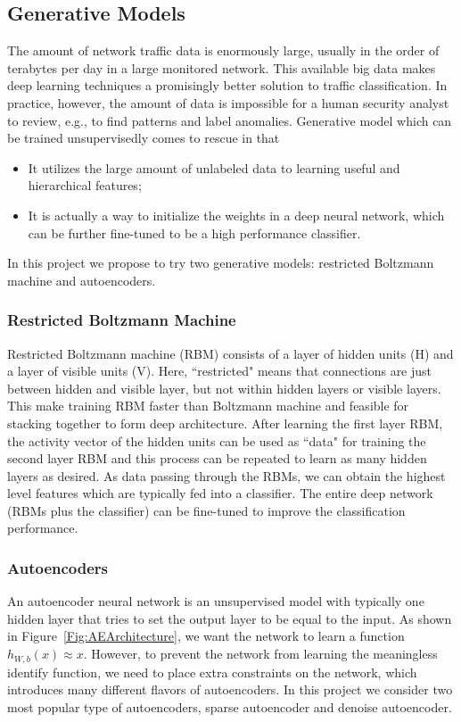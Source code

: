 \subsection{Generative Models}
The amount of network traffic data is enormously large, usually in the order of terabytes
per day in a large monitored network.
This available big data makes deep learning techniques a promisingly better solution
to traffic classification.
In practice, however, the amount of data is impossible for a human security analyst to review,
e.g., to find patterns and label anomalies.
Generative model which can be trained unsupervisedly comes to rescue in that
\begin{itemize}
\item It utilizes the large amount of unlabeled data to learning useful and hierarchical features;
\item It is actually a way to initialize the weights in a deep neural network, which can be
        further fine-tuned to be a high performance classifier.
\end{itemize}
In this project we propose to try two generative models: restricted Boltzmann machine and autoencoders.

\subsubsection{Restricted Boltzmann Machine}
Restricted Boltzmann machine (RBM) consists of a layer of hidden units (H) and a layer of visible units (V).
Here, ``restricted" means that connections are just between hidden and visible layer,
but not within hidden layers or visible layers.
This make training RBM faster than Boltzmann machine and feasible for stacking together
to form deep architecture.
After learning the first layer RBM, the activity vector of the hidden units can be used
as ``data" for training the second layer RBM
and this process can be repeated to learn as many hidden layers as desired.
As data passing through the RBMs, we can obtain the highest level features 
which are typically fed into a classifier.
The entire deep network (RBMs plus the classifier) can be fine-tuned to
improve the classification performance.



\subsubsection{Autoencoders}
An autoencoder neural network is an unsupervised model with typically one hidden layer that
tries to set the output layer to be equal to the input.
As shown in Figure~\ref{Fig:AEArchitecture}, we want the network to
learn a function $h_{W, b}(x) \approx x$.
However, to prevent the network from learning the meaningless identify function,
we need to place extra constraints on the network, which introduces many different
flavors of autoencoders.
In this project we consider two most popular type of autoencoders, sparse autoencoder and
denoise autoencoder.

